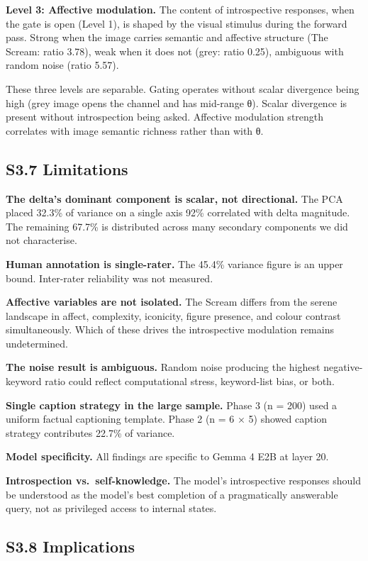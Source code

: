 \documentclass[11pt,a4paper]{article}
\begin{document}
\textbf{Level 3: Affective modulation.} The content of introspective responses, when the gate is open (Level 1), is shaped by the visual stimulus during the forward pass. Strong when the image carries semantic and affective structure (The Scream: ratio 3.78), weak when it does not (grey: ratio 0.25), ambiguous with random noise (ratio 5.57).

These three levels are separable. Gating operates without scalar divergence being high (grey image opens the channel and has mid-range θ). Scalar divergence is present without introspection being asked. Affective modulation strength correlates with image semantic richness rather than with θ.

\subsection*{S3.7 Limitations}

\textbf{The delta's dominant component is scalar, not directional.} The PCA placed 32.3\% of variance on a single axis 92\% correlated with delta magnitude. The remaining 67.7\% is distributed across many secondary components we did not characterise.

\textbf{Human annotation is single-rater.} The 45.4\% variance figure is an upper bound. Inter-rater reliability was not measured.

\textbf{Affective variables are not isolated.} The Scream differs from the serene landscape in affect, complexity, iconicity, figure presence, and colour contrast simultaneously. Which of these drives the introspective modulation remains undetermined.

\textbf{The noise result is ambiguous.} Random noise producing the highest negative-keyword ratio could reflect computational stress, keyword-list bias, or both.

\textbf{Single caption strategy in the large sample.} Phase 3 (n = 200) used a uniform factual captioning template. Phase 2 (n = 6 × 5) showed caption strategy contributes 22.7\% of variance.

\textbf{Model specificity.} All findings are specific to Gemma 4 E2B at layer 20.

\textbf{Introspection vs.~self-knowledge.} The model's introspective responses should be understood as the model's best completion of a pragmatically answerable query, not as privileged access to internal states.

\subsection*{S3.8 Implications}
\end{document}
